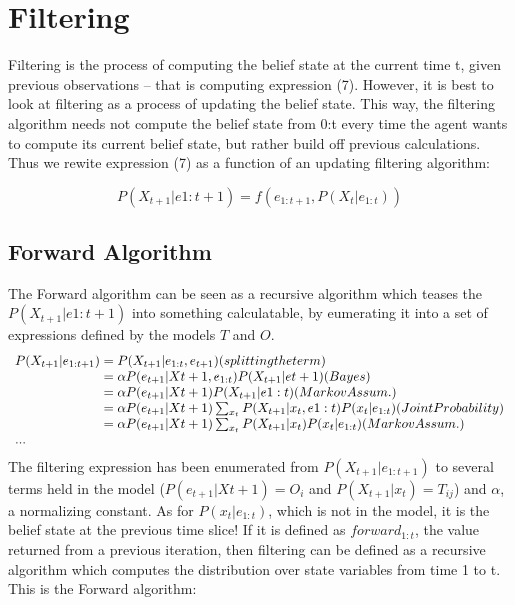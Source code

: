 \documentclass[a4paper]{article}
\begin{document}
\section{Filtering}

Filtering is the process of computing the belief state at the current time t, given previous observations -- that is computing expression (7). However, it is best to look at filtering as a process of updating the belief state. This way, the filtering algorithm needs not compute the belief state from 0:t every time the agent wants to compute its current belief state, but rather build off previous calculations. Thus we rewite expression (7) as a function of an updating filtering algorithm:

\begin{equation}
P(X_{t+1}|e{1:t+1}) = f(e_{1:t+1},P(X_t|e_{1:t}))
\end{equation}

\subsection{Forward Algorithm}

The Forward algorithm can be seen as a recursive algorithm which teases the $P(X_{t+1}|e{1:t+1})$ into something calculatable, by eumerating it into a set of expressions defined by the models $T$ and $O$.
\begin{equation}
\begin{array}{l@{}l}
P(X_{t+1}|e_{1:t+1})  
&{}= P(X_{t+1}|e_{1:t}, e_{t+1}) (splitting the term)\\
&{}= \alpha P(e_{t+1}|X{t+1}, e_{1:t})P(X_{t+1}|e{t+1})  (Bayes)\\
&{}= \alpha P(e_{t+1}|X{t+1})P(X_{t+1}|e{1:t})   (Markov Assum.)\\
&{}= \alpha P(e_{t+1}|X{t+1}) \sum_{\substack{x_t}} P(X_{t+1}|x_t,e{1:t})P(x_t|e_{1:t})(Joint Probability)\\
&{}= \alpha P(e_{t+1}|X{t+1}) \sum_{\substack{x_t}} P(X_{t+1}|x_t)P(x_t|e_{1:t})(Markov Assum.)\\
...
\end{array}
\end{equation}
The filtering expression has been enumerated from $P(X_{t+1}|e_{1:t+1})$ to several terms held in the model  ($P(e_{t+1}|X{t+1}) = O_i$ and $P(X_{t+1}|x_t) = T_{ij}$) and $\alpha$, a normalizing constant. As for $P(x_t|e_{1:t})$, which is not in the model, it is the belief state at the previous time slice! If it is defined as $forward_{1:t}$, the value returned from a previous iteration, then filtering can be defined as a recursive algorithm which computes the distribution over state variables from time 1 to t. This is the Forward algorithm:
\end{document}
